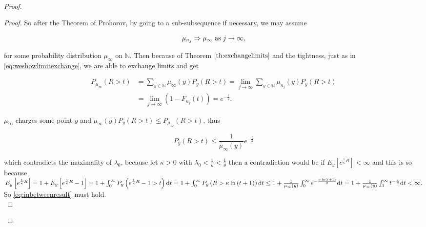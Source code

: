 \documentclass[12pt,a4paper]{scrartcl}
\numberwithin{equation}{section}
\newcommand{\N}{\mathbb{N}} %
\begin{document}
\begin{proof}
\begin{proof}
So after the Theorem of Prohorov, by going to a sub-subsequence if necessary, we may assume 

$$ \mu_{n_j} \Rightarrow \mu_{\infty} \textnormal{ as } j \to \infty,$$

for some probability distribution $ \mu_{\infty} $ on $\N$. Then because of Theorem $\ref{th:exchangelimits}$ and the tightness, just as in \eqref{eq:weshowlimitexchange}, we are able to exchange limits and get

\begin{align*}
P_{\mu_{\infty}}\left(R > t\right) &= \sum_{y \in \N} \mu_{\infty}\left(y\right) P_y\left(R > t \right) = \lim_{j \to \infty} \sum_{y \in \N} \mu_{n_j}\left(y\right) P_y\left(R > t\right) \\
&= \lim_{j\to \infty} \left(1-F_{n_j}\left(t\right)\right) = e^{-\frac{t}{\theta}}.
\end{align*}

$\mu_{\infty}$ charges some point $y$ and $ \mu_{\infty}\left(y\right) P_y\left(R > t\right) \leq P_{\mu_{\infty}}\left(R > t\right) $, thus

$$ P_y\left(R > t\right) \leq \frac{1}{\mu_{\infty}\left(y\right)} e^{-\frac{t}{\theta}} $$

which contradicts the maximality of $\lambda_0$, because let $\kappa >0 $ with $ \lambda_0 < \frac{1}{\kappa} < \frac{1}{\theta} $ then a contradiction would be if $ E_y\left[e^{\frac{1}{\kappa} R}\right] < \infty $ and this is so because  $E_{y}\left[ e^{\frac{1}{\kappa} R} \right] = 1 + E_{y}\left[ e^{\frac{1}{\kappa} R} -1 \right] = 1 + \int_{0}^{\infty} P_{y}\left(e^{\frac{1}{\kappa} R} - 1 > t\right) \textnormal{d}t = 1+\int_{0}^{\infty} P_{y}\left( R > \kappa \ln\left(t+1\right)\right) \textnormal{d}t \leq 1+ \frac{1}{\mu_{\infty}\left(y\right)} \int_{0}^{\infty} e^{-\frac{\kappa \ln\left(t+1\right)}{\theta}} \textnormal{d}t = 1  +  \frac{1}{\mu_{\infty}\left(y\right)} \int_1^{\infty} t^{-\frac{\kappa}{\theta}} \textnormal{d} t < \infty. $ 
So \eqref{eq:inbetweenresult} must hold. \\[2ex]


\end{proof}
\end{proof}
\end{document}
